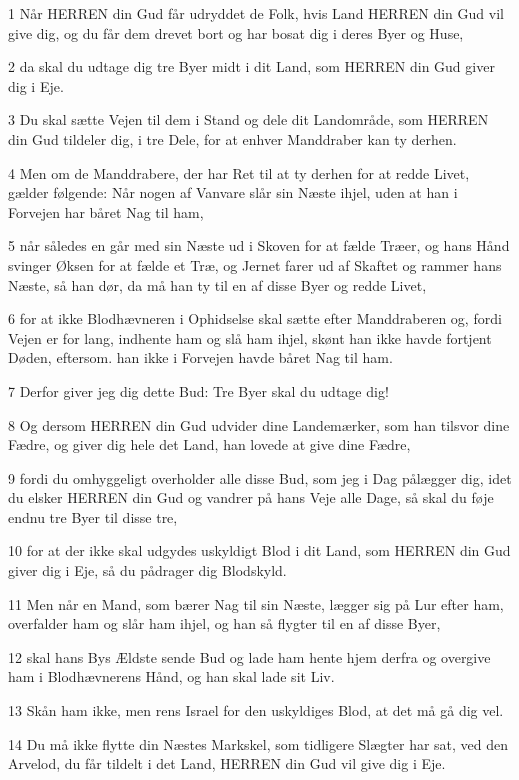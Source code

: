 \par 1 Når HERREN din Gud får udryddet de Folk, hvis Land HERREN din Gud vil give dig, og du får dem drevet bort og har bosat dig i deres Byer og Huse,
\par 2 da skal du udtage dig tre Byer midt i dit Land, som HERREN din Gud giver dig i Eje.
\par 3 Du skal sætte Vejen til dem i Stand og dele dit Landområde, som HERREN din Gud tildeler dig, i tre Dele, for at enhver Manddraber kan ty derhen.
\par 4 Men om de Manddrabere, der har Ret til at ty derhen for at redde Livet, gælder følgende: Når nogen af Vanvare slår sin Næste ihjel, uden at han i Forvejen har båret Nag til ham,
\par 5 når således en går med sin Næste ud i Skoven for at fælde Træer, og hans Hånd svinger Øksen for at fælde et Træ, og Jernet farer ud af Skaftet og rammer hans Næste, så han dør, da må han ty til en af disse Byer og redde Livet,
\par 6 for at ikke Blodhævneren i Ophidselse skal sætte efter Manddraberen og, fordi Vejen er for lang, indhente ham og slå ham ihjel, skønt han ikke havde fortjent Døden, eftersom. han ikke i Forvejen havde båret Nag til ham.
\par 7 Derfor giver jeg dig dette Bud: Tre Byer skal du udtage dig!
\par 8 Og dersom HERREN din Gud udvider dine Landemærker, som han tilsvor dine Fædre, og giver dig hele det Land, han lovede at give dine Fædre,
\par 9 fordi du omhyggeligt overholder alle disse Bud, som jeg i Dag pålægger dig, idet du elsker HERREN din Gud og vandrer på hans Veje alle Dage, så skal du føje endnu tre Byer til disse tre,
\par 10 for at der ikke skal udgydes uskyldigt Blod i dit Land, som HERREN din Gud giver dig i Eje, så du pådrager dig Blodskyld.
\par 11 Men når en Mand, som bærer Nag til sin Næste, lægger sig på Lur efter ham, overfalder ham og slår ham ihjel, og han så flygter til en af disse Byer,
\par 12 skal hans Bys Ældste sende Bud og lade ham hente hjem derfra og overgive ham i Blodhævnerens Hånd, og han skal lade sit Liv.
\par 13 Skån ham ikke, men rens Israel for den uskyldiges Blod, at det må gå dig vel.
\par 14 Du må ikke flytte din Næstes Markskel, som tidligere Slægter har sat, ved den Arvelod, du får tildelt i det Land, HERREN din Gud vil give dig i Eje.
